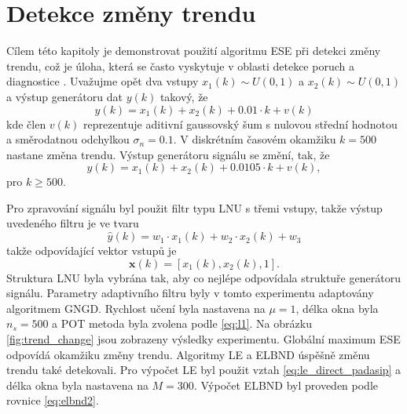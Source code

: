 \section{Detekce změny trendu}\label{chap:mdpi_trendchange}
Cílem této kapitoly je demonstrovat použití algoritmu ESE při detekci změny trendu, což je úloha, která se často vyskytuje v oblasti detekce poruch a diagnostice \cite{diagnosis}. Uvažujme opět dva vstupy $x_1(k) \sim U(0,1)$ a $x_2(k)\sim U(0,1)$ a výstup generátoru dat $y(k)$ takový, že
\begin{equation}
    y(k)=x_1(k)+x_2(k)+0.01\cdot k + v(k)
\end{equation}
kde člen $v(k)$ reprezentuje aditivní gaussovský šum s nulovou střední hodnotou a směrodatnou odchylkou $\sigma_n=0.1$. V diskrétním časovém okamžiku $k=500$ nastane změna trendu. Výstup generátoru signálu se změní, tak, že
\begin{equation}
     y(k)=x_1(k)+x_2(k)+0.0105 \cdot k + v(k),
\end{equation}
pro $k\geq 500$. 
\par
Pro zpravování signálu byl použit filtr typu LNU s třemi vstupy, takže výstup uvedeného filtru je ve tvaru
\begin{equation}
    \hat{y}(k)=w_1\cdot x_1(k)+w_2\cdot x_2(k)+w_3
\end{equation}
takže odpovídající vektor vstupů je
\begin{equation}
    \textbf{x}(k)=[x_1(k),x_2(k),1].
\end{equation}
Struktura LNU byla vybrána tak, aby co nejlépe odpovídala struktuře generátoru signálu. Parametry adaptivního filtru byly v tomto experimentu adaptovány algoritmem GNGD. Rychlost učení byla nastavena na $\mu=1$, délka okna byla $n_s=500$ a POT metoda byla zvolena podle \ref{eq:l1}. Na obrázku \ref{fig:trend_change} jsou zobrazeny výsledky experimentu. Globální maximum ESE odpovídá okamžiku změny trendu. Algoritmy LE a ELBND úspěšně změnu trendu také detekovali. Pro výpočet LE byl použit vztah \ref{eq:le_direct_padasip} a délka okna byla nastavena na $M=300$. Výpočet ELBND byl proveden podle rovnice \ref{eq:elbnd2}.

